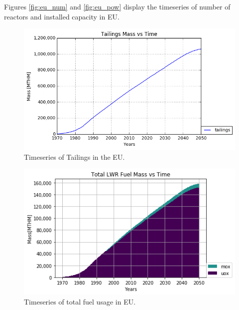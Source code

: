 Figures \ref{fig:eu_num} and \ref{fig:eu_pow} display the
timeseries of number of reactors and installed capacity in \gls{EU}.



\begin{figure}[htbp!]
	\begin{center}
		\includegraphics[scale=0.7]{./images/eu_future/tailings.png}
	\end{center}
	\caption{Timeseries of Tailings in the \gls{EU}.}
	\label{fig:eu_tail}
\end{figure}

\begin{figure}[htbp!]
	\begin{center}
		\includegraphics[scale=0.7]{./images/eu_future/total_fuel.png}
	\end{center}
	\caption{Timeseries of total fuel usage in \gls{EU}.}
	\label{fig:eu_fuel}
\end{figure}


